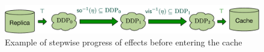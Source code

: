 \begin{figure}[h]
	\centering
	\includegraphics[scale = 0.4]{Figures/Availability_deg.pdf}
\caption{Example of stepwise progress of effects before entering the
cache}
\label{fig:avail_deg}
\end{figure}
